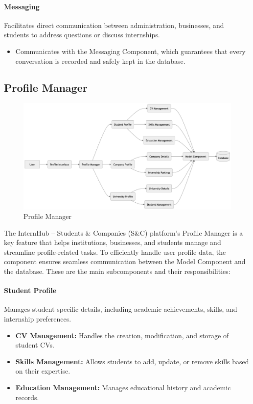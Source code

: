 \paragraph{Messaging}
Facilitates direct communication between administration, businesses, and students to address questions or discuss internships.
\begin{itemize}
    \item Communicates with the Messaging Component, which guarantees that every conversation is recorded and safely kept in the database.
\end{itemize}

\subsection{Profile Manager}
\label{subsubsec:profile_manager}

\begin{figure}[H]
    \begin{center}
        \includegraphics[width=0.82\linewidth]{JhaBhatiaSharma/imagesDD/ProfileManager.png}
        \caption{Profile Manager}
        \label{fig:profilemanager}%
    \end{center}
\end{figure}

The InternHub – Students \& Companies (S\&C) platform's Profile Manager is a key feature that helps institutions, businesses, and students manage and streamline profile-related tasks. To efficiently handle user profile data, the component ensures seamless communication between the Model Component and the database. These are the main subcomponents and their responsibilities:

\paragraph{Student Profile}
Manages student-specific details, including academic achievements, skills, and internship preferences.
\begin{itemize}
    \item \textbf{CV Management:} Handles the creation, modification, and storage of student CVs.
    \item \textbf{Skills Management:} Allows students to add, update, or remove skills based on their expertise.
    \item \textbf{Education Management:} Manages educational history and academic records.
\end{itemize}


